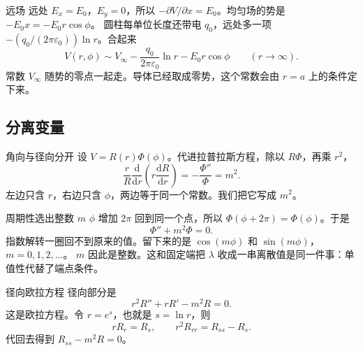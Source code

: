 \documentclass[fontset=windows, chinese, 10pt, xcolor=dvipsnames]{beamer}
\begin{document}
\begin{frame}{远场}
  远处 $E_x=E_0$，$E_y=0$，所以 $-\partial V/\partial x=E_0$。均匀场的势是 $-E_0 x=-E_0 r\cos\phi$。
  \vspace{0.3em}
  圆柱每单位长度还带电 $q_0$，远处多一项 $-(q_0/(2\pi\varepsilon_0))\ln r$。合起来
  \begin{equation*}
    V(r,\phi)\sim
    V_{\infty}-\frac{q_0}{2\pi\varepsilon_0}\ln r-E_0 r\cos\phi
    \qquad (r\to\infty).
  \end{equation*}
  常数 $V_{\infty}$ 随势的零点一起走。导体已经取成零势，这个常数会由 $r=a$ 上的条件定下来。
\end{frame}

\subsection{分离变量}

\begin{frame}{角向与径向分开}
  设 $V=R(r)\Phi(\phi)$。代进拉普拉斯方程，除以 $R\Phi$，再乘 $r^2$，
  \begin{equation*}
    \frac{r}{R}\frac{\mathrm{d}}{\mathrm{d}r}
      \left(r\frac{\mathrm{d}R}{\mathrm{d}r}\right)
    =-\frac{\Phi''}{\Phi}=m^2.
  \end{equation*}
  左边只含 $r$，右边只含 $\phi$，两边等于同一个常数。我们把它写成 $m^2$。
\end{frame}

\begin{frame}{周期性选出整数 $m$}
  $\phi$ 增加 $2\pi$ 回到同一个点，所以 $\Phi(\phi+2\pi)=\Phi(\phi)$。于是
  \begin{equation*}
    \Phi''+m^2\Phi=0.
  \end{equation*}
  指数解转一圈回不到原来的值。留下来的是 $\cos(m\phi)$ 和 $\sin(m\phi)$，$m=0,1,2,\ldots$。
  \vspace{0.3em}
  $m$ 因此是整数。这和固定端把 $\lambda$ 收成一串离散值是同一件事：单值性代替了端点条件。
\end{frame}

\begin{frame}{径向欧拉方程}
  径向部分是
  \begin{equation*}
    r^2 R''+r R'-m^2 R=0.
  \end{equation*}
  这是欧拉方程。令 $r=e^{s}$，也就是 $s=\ln r$，则
  \begin{equation*}
    r R_r=R_s,
    \qquad
    r^2 R_{rr}=R_{ss}-R_s.
  \end{equation*}
  代回去得到 $R_{ss}-m^2 R=0$。
\end{frame}
\end{document}
